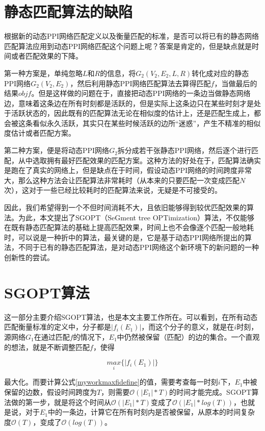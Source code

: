\section{静态匹配算法的缺陷}
根据新的动态PPI网络匹配定义以及衡量匹配的标准，是否可以将已有的静态网络匹配算法应用到动态PPI网络匹配这个问题上呢？答案是肯定的，但是缺点就是时间或者匹配效果的下降。

第一种方案是，单纯忽略$L$和$R$的信息，将$G_2(V_2,E_2,L,R)$转化成对应的静态PPI网络$G_2(V_2,E_2)$，然后利用静态PPI网络匹配算法去算得匹配$f$，当做最后的结果$objf$。但是这样做的问题在于，直接把动态PPI网络的一条边当做静态网络边，意味着这条边在所有时刻都是活跃的，但是实际上这条边只在某些时刻才是处于活跃状态的，因此既有的匹配算法无论在相似度的估计上，还是匹配生成上，都会被这条看似永久活跃，其实只在某些时候活跃的边所“迷惑”，产生不精准的相似度估计或者匹配方案。

第二种方案，便是将动态PPI网络$G_2$拆分成若干张静态PPI网络，然后逐个进行匹配，从中选取拥有最好匹配效果的匹配方案。这种方法的好处在于，匹配算法确实是跑在了真实的网络上，但是缺点在于时间，假设动态PPI网络的时间跨度非常大，那么这种方法会让匹配算法非常耗时（从本来的只要匹配一次变成匹配$N$次），这对于一些已经比较耗时的匹配算法来说，无疑是不可接受的。

因此，我们希望得到一个不但时间消耗不大，且依旧能够得到较优匹配效果的算法。为此，本文提出了SGOPT（SeGment tree OPTimization）算法，不仅能够在既有静态匹配算法的基础上提高匹配效果，时间上也不会像逐个匹配一般地耗时，可以说是一种折中的算法，最关键的是，它是基于动态PPI网络所提出的算法，不同于已有的静态匹配算法，是对动态PPI网络这个新环境下的新问题的一种创新性的尝试。
\section{SGOPT算法}
这一部分主要介绍SGOPT算法，也是本文主要工作所在。可以看到，在所有动态匹配衡量标准的定义中，分子都是$|f_i(E_1)|$，而这个分子的意义，就是在$i$时刻，源网络$G_1$在通过匹配$f$的情况下，$E_1$中仍然被保留（匹配）的边的集合。一个直观的想法，就是不断调整匹配$f$，使得

\begin{equation}\label{myworkmaxfidefine}    
\underset{i}{max}\{ |f_i(E_1)|\}
\end{equation}

最大化。而要计算公式\ref{myworkmaxfidefine}的值，需要考查每一时刻$i$下，$E_1$中被保留的边数，假设时间跨度为$T$，则需要$\mathcal{O}(|E_1|*T)$的时间才能完成。SGOPT算法做的第一步，就是将这个时间从$\mathcal{O}(|E_1|*T)$变成了$\mathcal{O}(|E_1|*log(T))$，也就是说，对于$E_1$中的一条边，计算它在所有时刻内是否被保留，从原本的时间复杂度$\mathcal{O}(T)$，变成了$\mathcal{O}(log(T))$。

